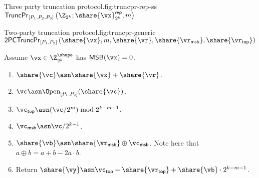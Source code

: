 \begin{Boxfig}{Three party truncation protocol.}{fig:truncpr-rep-ss}{$\mathsf{TruncPr}_{[P_1, P_2, P_3]} \left(\Z_{2^k}; \share{\vx}^{\mathsf{rep}}_{2^k}, m \right)$}
\begin{enumerate}
\end{enumerate}

\end{Boxfig}

\begin{Boxfig}{Two-party truncation protocol.}{fig:truncpr-generic}
  {$\mathsf{2PCTruncPr}_{[P_1, P_2]} \left( \share{\vx}, m, \share{\vr}, \share{\vr_{\mathsf{msb}}}, \share{\vr_{\mathsf{top}}} \right)$}

  Assume $\vx \in \Z_{2^k}^{\shape}$ has $\mathsf{MSB}(\vx) = 0$.
  \begin{enumerate}

  \item $\share{\vc} \asn \share{\vx} + \share{\vr}$.

  \item $\vc \asn \Open_{[P_1, P_2]}(\share{\vc})$.

  \item $\vc_{\mathsf{top}} \asn (\vc / 2^m) \bmod 2^{k-m-1}$.

  \item $\vc_{\mathsf{msb}} \asn \vc / 2^{k-1}$.

  \item $\share{\vb} \asn \share{\vr_{\mathsf{msb}}} \oplus \vc_{\mathsf{msb}}$. Note here that $a \oplus b = a + b - 2a\cdot b$.

  \item Return $\share{\vy} \asn \vc_{\mathsf{top}} - \share{\vr_{\mathsf{top}}} + \share{\vb} \cdot 2^{k-m-1}$.
\end{enumerate}

\end{Boxfig}


